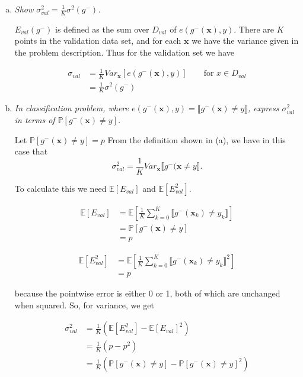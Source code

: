 \documentclass{article}
\renewcommand{\vec}[1]{\mathbf{#1}}
\begin{document}
\begin{enumerate}[(a)]
  \item \textit{Show $\sigma_{val}^2 = \frac{1}{K}\sigma^2(g^-)$.}

    $E_{val}(g^-)$ is defined as the sum over $D_{val}$ of $e(g^-(\vec{x}),y)$. There are $K$ 
    points in the validation data set, and for each $\vec{x}$ we have the variance given in the
    problem description. Thus for the validation set we have

    \begin{align*}
      \sigma_{val}&= \frac{1}{K}Var_{\vec{x}}[e(g^-(\vec{x}),y)]\qquad\text{for } x \in D_{val}\\
      &= \frac{1}{K}\sigma^2(g^-)
    \end{align*}

  \item \textit{In classification problem, where $e(g^-(\vec{x}),y) = \llbracket g^-(\vec{x}) \neq y\rrbracket$,
    express $\sigma_{val}^2$ in terms of $\mathbb{P}[g^-(\vec{x})\neq y]$.}

    Let $\mathbb{P}[g^-(\vec{x}) \neq y] = p$ From the definition shown in (a), we have in this
    case that$$\sigma_{val}^2 = \frac{1}{K}Var_\vec{x}\llbracket g^-(\vec{x} \neq y \rrbracket.$$

    To calculate this we need $\mathbb{E}[E_{val}]$ and $\mathbb{E}[E_{val}^2]$.

    \begin{align*}
      \mathbb{E}[E_{val}] &= \mathbb{E}\left[\frac{1}{K} \sum_{k = 0}^K \llbracket g^-(\vec{x}_k) \neq y_k \rrbracket \right] \\
      &= \mathbb{P}[g^-(\vec{x}) \neq y] \\
      &= p
    \end{align*}

    \begin{align*}
      \mathbb{E}[E_{val}^2] &= \mathbb{E}\left[\frac{1}{K} \sum_{k = 0}^K \llbracket g^-(\vec{x}_k) \neq y_k \rrbracket^2 \right] \\
      &= p
    \end{align*}

    because the pointwise error is either 0 or 1, both of which are unchanged when squared. So,
    for variance, we get

    \begin{align*}
      \sigma_{val}^2 &= \frac{1}{K}\left(\mathbb{E}[E_{val}^2] - \mathbb{E}[E_{val}]^2 \right)\\
      &= \frac{1}{K}\left( p - p^2 \right) \\
      &= \frac{1}{K}(\mathbb{P}[g^-(\vec{x}) \neq y] - \mathbb{P}[g^-(\vec{x}) \neq y]^2)
    \end{align*}




\end{enumerate}
\end{document}
